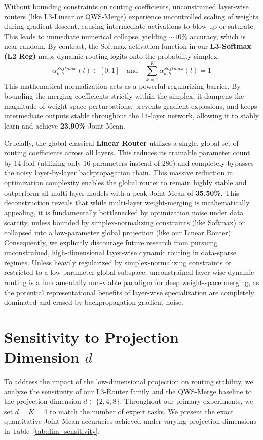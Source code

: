 Without bounding constraints on routing coefficients, unconstrained layer-wise routers (like L3-Linear or QWS-Merge) experience uncontrolled scaling of weights during gradient descent, causing intermediate activations to blow up or saturate. This leads to immediate numerical collapse, yielding $\sim 10\%$ accuracy, which is near-random. By contrast, the Softmax activation function in our \textbf{L3-Softmax (L2 Reg)} maps dynamic routing logits onto the probability simplex:
\begin{equation}
    \alpha_{k, b}^{Softmax}(l) \in [0, 1] \quad \text{and} \quad \sum_{k=1}^K \alpha_{k, b}^{Softmax}(l) = 1
\end{equation}
This mathematical normalization acts as a powerful regularizing barrier. By bounding the merging coefficients strictly within the simplex, it dampens the magnitude of weight-space perturbations, prevents gradient explosions, and keeps intermediate outputs stable throughout the 14-layer network, allowing it to stably learn and achieve \textbf{23.90\%} Joint Mean.

Crucially, the global classical \textbf{Linear Router} utilizes a single, global set of routing coefficients across all layers. This reduces its trainable parameter count by 14-fold (utilizing only 16 parameters instead of 280) and completely bypasses the noisy layer-by-layer backpropagation chain. This massive reduction in optimization complexity enables the global router to remain highly stable and outperform all multi-layer models with a peak Joint Mean of \textbf{35.50\%}. This deconstruction reveals that while multi-layer weight-merging is mathematically appealing, it is fundamentally bottlenecked by optimization noise under data scarcity, unless bounded by simplex-normalizing constraints (like Softmax) or collapsed into a low-parameter global projection (like our Linear Router). Consequently, we explicitly discourage future research from pursuing unconstrained, high-dimensional layer-wise dynamic routing in data-sparse regimes. Unless heavily regularized by simplex-normalizing constraints or restricted to a low-parameter global subspace, unconstrained layer-wise dynamic routing is a fundamentally non-viable paradigm for deep weight-space merging, as the potential representational benefits of layer-wise specialization are completely dominated and erased by backpropagation gradient noise.

\section{Sensitivity to Projection Dimension $d$}
\label{sec:dim_sensitivity_app}
To address the impact of the low-dimensional projection on routing stability, we analyze the sensitivity of our L3-Router family and the QWS-Merge baseline to the projection dimension $d \in \{2, 4, 8\}$. Throughout our primary experiments, we set $d = K = 4$ to match the number of expert tasks. We present the exact quantitative Joint Mean accuracies achieved under varying projection dimensions in Table~\ref{tab:dim_sensitivity}.

